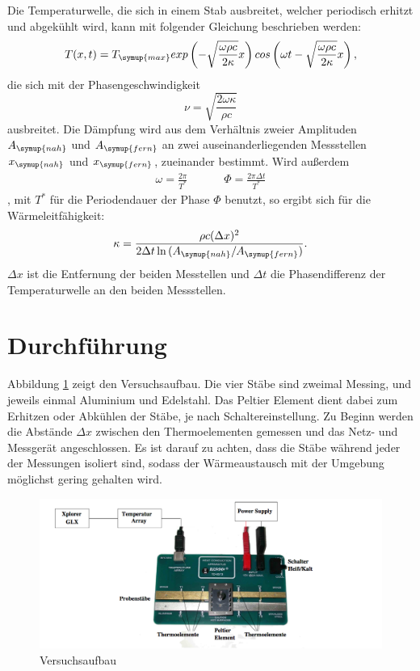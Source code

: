 \noindent Die Temperaturwelle, die sich in einem Stab ausbreitet, welcher periodisch
erhitzt und abgekühlt wird, kann mit folgender Gleichung beschrieben werden:
\begin{equation*}
  T(x, t) = T_\symup{max} exp\left(- \sqrt{\frac{\omega \rho c}{2 \kappa}}x\right) cos \left(\omega t - \sqrt{\frac{\omega \rho c}{2 \kappa}} x\right),
\end{equation*}
die sich mit der Phasengeschwindigkeit
\begin{equation*}
  \nu = \sqrt{\frac{2 \omega \kappa}{\rho c}}
\end{equation*}
ausbreitet.
\FloatBarrier
Die Dämpfung wird aus dem Verhältnis zweier Amplituden$A_\symup{nah}$ und $A_\symup{fern}$
an zwei auseinanderliegenden Messstellen $x_\symup{nah}$ und $x_\symup{fern}$, zueinander bestimmt.
Wird außerdem
\begin{align*}
  \omega = \frac{2 \pi}{T^*} &&&& \Phi = \frac{2\pi \Delta t}{T^*}
\end{align*}
, mit $T^*$ für die Periodendauer der Phase $\Phi$ benutzt, so ergibt sich für die Wärmeleitfähigkeit:
\begin{equation*}
  \kappa = \frac{\rho c (\Delta x)^2}{2 \Delta t \ln{(A_\symup{nah} / A_\symup{fern})}}.
\end{equation*}
$\Delta x$ ist die Entfernung der beiden Messtellen und $\Delta t$ die Phasendifferenz
der Temperaturwelle an den beiden Messstellen.

\section{Durchführung}
Abbildung \ref{abb1} zeigt den Versuchsaufbau.
Die vier Stäbe sind zweimal Messing, und jeweils einmal Aluminium und Edelstahl.
Das Peltier Element dient dabei zum Erhitzen oder Abkühlen der Stäbe, je nach Schaltereinstellung.
Zu Beginn werden die Abstände $\Delta x$ zwischen den Thermoelementen gemessen und
das Netz- und Messgerät angeschlossen. Es ist darauf zu achten, dass die Stäbe während
jeder der Messungen isoliert sind, sodass der Wärmeaustausch mit der Umgebung möglichst gering
gehalten wird.

\begin{figure}
  \centering
  \includegraphics[scale=0.4]{Aufbau.PNG}
  \caption{Versuchsaufbau \cite{Quelle}}
  \label{abb1}
\end{figure}

